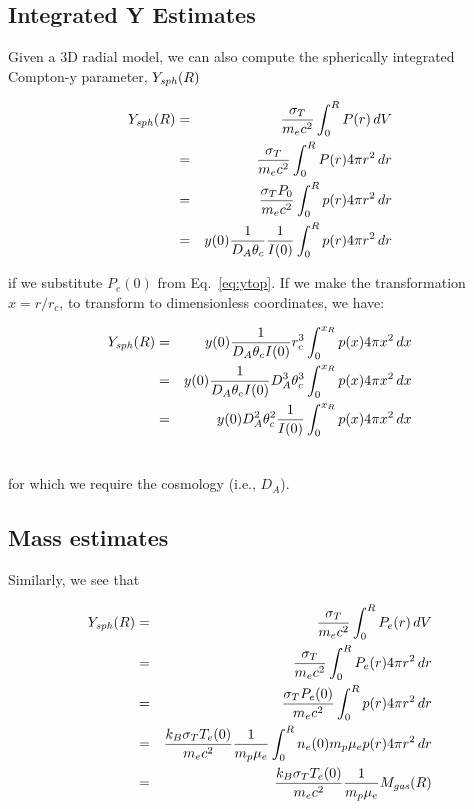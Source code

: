 \subsection{Integrated Y Estimates}

Given a 3D radial model, we can also compute the spherically integrated Compton-y parameter, $Y_{\it sph}(R)$

\begin{eqnarray}
Y_{\it sph}(R) &=& {{\sigma_T}\over{m_e c^2}}\int^{R}_{0}{P(r)\,dV}\\\nonumber
\label{eq:ysph}
     &=& {{\sigma_T}\over{m_e c^2}}\int^{R}_{0}{P(r) 4\pi r^2\,dr}\\\nonumber
     &=& {{\sigma_T P_0}\over{m_e c^2}}\int^{R}_{0}{p(r)4\pi r^2\,dr}\\
     &=& y(0){1\over{D_A\theta_c}}{1\over{I(0)}}\int^{R}_{0}{p(r)4\pi r^2\,dr}
\end{eqnarray}

if we substitute $P_e(0)$ from Eq.~\ref{eq:ytop}.  If we make the transformation $x = r/r_c$, to transform to dimensionless coordinates, we have:

\begin{eqnarray}
Y_{\it sph}(R) &=& y(0){1\over{D_A\theta_cI(0)}}r^3_c\int^{x_R}_{0}{p(x)4\pi x^2\,dx}\\\nonumber
               &=& y(0){1\over{D_A\theta_cI(0)}}D^3_A\theta^3_c\int^{x_R}_{0}{p(x)4\pi x^2\,dx}\\\nonumber
               &=& y(0)D^2_A\theta^2_c{1\over{I(0)}}\int^{x_R}_{0}{p(x)4\pi x^2\,dx}\\\nonumber
\end{eqnarray}

for which we require the cosmology (i.e., $D_A$).

\subsection{Mass estimates}

Similarly, we see that

\begin{eqnarray}
Y_{\it sph}(R) &=& {{\sigma_T}\over{m_e c^2}}\int^{R}_{0}{P_e(r)\,dV}\\\nonumber
     &=& {{\sigma_T}\over{m_e c^2}}\int^{R}_{0}{P_e(r) 4\pi r^2\,dr}\\\nonumber
     &=& {{\sigma_T P_e(0)}\over{m_e c^2}}\int^{R}_{0}{p(r)4\pi r^2\,dr}\\\nonumber
     &=& {{k_B\sigma_T T_e(0)}\over{m_e c^2}}{1\over{m_p\mu_e}}\int^{R}_{0}{n_e(0)m_p\mu_ep(r)4\pi r^2\,dr}\\\nonumber
     &=& {{k_B\sigma_T T_e(0)}\over{m_e c^2}}{1\over{m_p\mu_e}}M_{\it gas}(R)\\\nonumber
\end{eqnarray}

